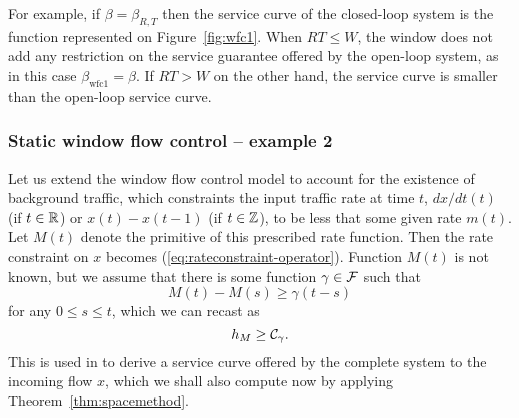 
For example, if $\beta = \beta_{R,T}$ then the service curve of the closed-loop system is the function represented on
Figure~\ref{fig:wfc1}. When $RT \leq W$, the window does not add any restriction on the service guarantee offered by the open-loop system, as in this case $\beta_{\mbox{wfc}1} = \beta$. If $RT > W$ on the other hand, the service curve is smaller than the open-loop service curve.

\begin{figure}[!h]
    \protect{}
\end{figure}



\subsubsection{Static window flow control -- example 2}

Let us extend the window flow control model to account for the existence of background traffic,
which constraints the input traffic rate at time $t$,
$dx/dt(t)$ (if $t \in \mathbb{R}$) or $x(t) - x(t-1)$ (if $t \in \mathbb{Z}$), to be less that some given rate $m(t)$. Let $M(t)$ denote the primitive of this
prescribed rate function.
Then the rate constraint on $x$ becomes (\ref{eq:rateconstraint-operator}).
Function $M(t)$ is not known, but we assume that there is some function $\gamma \in \mathcal F$ such that
$$M(t) - M(s) \geq \gamma(t - s) $$
for any $0 \leq s \leq t$, which we can recast as
\begin{equation}
\mylabel{eq:ratelowerbound}
 h_{M} \geq \calC_{\gamma}.
\end{equation}
 This is used in \cite{CO96} to derive a service curve offered by the complete system to the incoming flow $x$,
which we shall also compute now by applying
Theorem~\ref{thm:spacemethod}.

